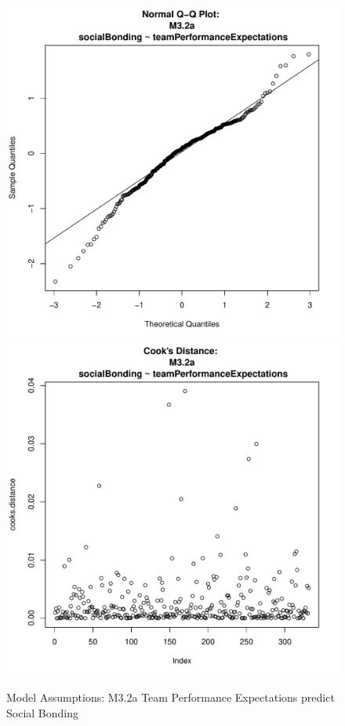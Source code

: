 \documentclass[12pt]{report}
\begin{document}
{\begin{figure}[htbp]
  \includegraphics[scale =.4]{../images/MLM32aQQNorm.pdf}
  \includegraphics[scale =.4]{../images/MLM32aCooksD.pdf}
  \caption{Model Assumptions: M3.2a Team Performance Expectations predict Social Bonding}
  \label{fig:MLM32aAssumptions}
\end{figure}


}
\end{document}
